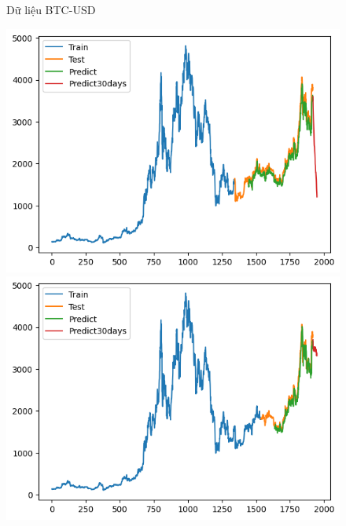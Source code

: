 \documentclass[conference]{IEEEtran}
\begin{document}
\begin{figure}[H]
\begin{minipage}{0.15\textwidth}
		\end{minipage}
		\caption{Dữ liệu BTC-USD}
		\label{fig:1}
	\end{figure}
	
\begin{figure}[H]
	\centering
	\begin{minipage}{0.15\textwidth}
		\centering
		\includegraphics[width=1\textwidth]{Figure/TimesNet_ETH_73.png}
	\end{minipage}
	\hfill
	\begin{minipage}{0.15\textwidth}
		\centering
		\includegraphics[width=1\textwidth]{Figure/TimesNet_ETH_82.png}
	\end{minipage}
	\hfill
	\begin{minipage}{0.15\textwidth}
		\centering

\end{minipage}
\end{figure}
\end{document}
